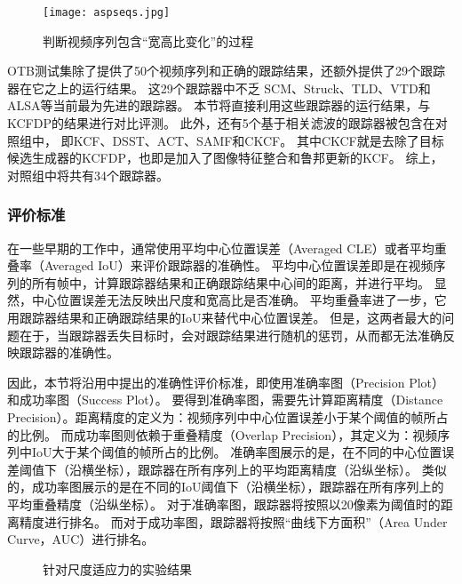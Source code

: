 \begin{figure}[htb]
	\centering
		\texttt{[image: aspseqs.jpg]}
	\caption{判断视频序列包含``宽高比变化''的过程}
	\label{aspseqs}
\end{figure}

OTB测试集除了提供了50个视频序列和正确的跟踪结果，还额外提供了29个跟踪器在它之上的运行结果。
这29个跟踪器中不乏
SCM、Struck、TLD、VTD和ALSA等当前最为先进的跟踪器。
本节将直接利用这些跟踪器的运行结果，与KCFDP的结果进行对比评测。
此外，还有5个基于相关滤波的跟踪器被包含在对照组中，
即KCF、DSST、ACT、SAMF和CKCF。
其中CKCF就是去除了目标候选生成器的KCFDP，也即是加入了图像特征整合和鲁邦更新的KCF。
综上，对照组中将共有34个跟踪器。

\subsubsection{评价标准}
在一些早期的工作中，通常使用平均中心位置误差（Averaged CLE）或者平均重叠率（Averaged IoU）来评价跟踪器的准确性。
平均中心位置误差即是在视频序列的所有帧中，计算跟踪器结果和正确跟踪结果中心间的距离，并进行平均。
显然，中心位置误差无法反映出尺度和宽高比是否准确。
平均重叠率进了一步，它用跟踪器结果和正确跟踪结果的IoU来替代中心位置误差。
但是，这两者最大的问题在于，当跟踪器丢失目标时，会对跟踪结果进行随机的惩罚，从而都无法准确反映跟踪器的准确性。

因此，本节将沿用\cite{50seqs}中提出的准确性评价标准，即使用准确率图（Precision Plot）和成功率图（Success Plot）。
要得到准确率图，需要先计算距离精度（Distance Precision）。距离精度的定义为：视频序列中中心位置误差小于某个阈值的帧所占的比例。
而成功率图则依赖于重叠精度（Overlap Precision），其定义为：视频序列中IoU大于某个阈值的帧所占的比例。
准确率图展示的是，在不同的中心位置误差阈值下（沿横坐标），跟踪器在所有序列上的平均距离精度（沿纵坐标）。
类似的，成功率图展示的是在不同的IoU阈值下（沿横坐标），跟踪器在所有序列上的平均重叠精度（沿纵坐标）。
对于准确率图，跟踪器将按照以20像素为阈值时的距离精度进行排名。
而对于成功率图，跟踪器将按照``曲线下方面积''（Area Under Curve，AUC）进行排名。

\begin{figure}[htb]
  \centering
  \hspace{-2.2cm}
  \newline
  \caption{针对尺度适应力的实验结果}
  \label{result1}
\end{figure}

